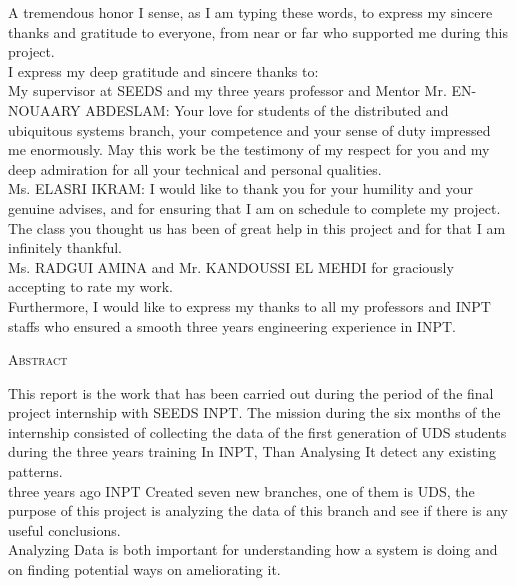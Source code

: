 \documentclass[12pt]{extreport}
\begin{document}
\large A tremendous honor I sense, as I am typing these words, to express my sincere thanks and gratitude to everyone, from near or far who supported me during this project.\\

I express my deep gratitude and sincere thanks to:\\

My supervisor at SEEDS and my three years professor and Mentor Mr. EN-NOUAARY ABDESLAM: Your love for students of the distributed and ubiquitous systems branch, your competence and your sense of duty impressed me enormously. May this work be the testimony of my respect for you and my deep admiration for all your technical and personal qualities.\\

Ms. ELASRI IKRAM: I would like to thank you for your humility and your genuine advises, and for ensuring that I am on schedule to complete my project. The class you thought us has been of great help in this project and for that I am infinitely thankful.\\

Ms. RADGUI AMINA and Mr. KANDOUSSI EL MEHDI for graciously accepting to rate my work.\\

Furthermore, I would like to express my thanks to all my professors and INPT staffs who ensured a smooth three years engineering experience in INPT.




\newpage
\thispagestyle{empty}
\begin{center}
\textsc{\LARGE Abstract}\\
[1.5cm]
\end{center}

\large This report is the work that has been carried out during the period of the final project internship with SEEDS INPT. The mission during the six months of the internship consisted of collecting the data of the first generation of UDS students during the three years training In INPT, Than Analysing It detect any existing patterns.\\


three years ago INPT Created seven new branches, one of them is UDS, the purpose of this project is analyzing the data of this branch and see if there is any useful conclusions.\\


Analyzing Data is both important for understanding how a system is doing and on finding potential ways on ameliorating it.
\end{document}
